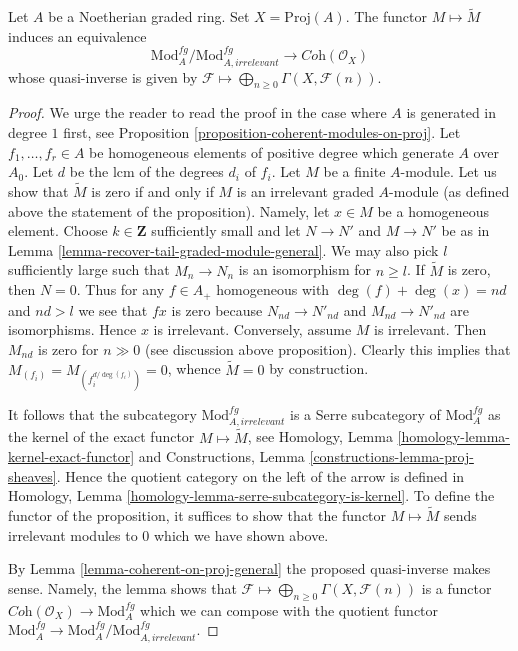 \begin{proposition}
\label{proposition-coherent-modules-on-proj-general}
Let $A$ be a Noetherian graded ring. Set $X = \text{Proj}(A)$. The functor
$M \mapsto \widetilde M$ induces an equivalence
$$
\text{Mod}^{fg}_A/\text{Mod}^{fg}_{A, irrelevant}
\longrightarrow
\textit{Coh}(\mathcal{O}_X)
$$
whose quasi-inverse is given by
$\mathcal{F} \longmapsto \bigoplus_{n \geq 0} \Gamma(X, \mathcal{F}(n))$.
\end{proposition}

\begin{proof}
We urge the reader to read the proof in the case where $A$
is generated in degree $1$ first, see
Proposition \ref{proposition-coherent-modules-on-proj}.
Let $f_1, \ldots, f_r \in A$ be homogeneous elements of positive degree
which generate $A$ over $A_0$. Let $d$ be the lcm of the degrees
$d_i$ of $f_i$. Let $M$ be a finite $A$-module.
Let us show that $\widetilde{M}$ is zero if and
only if $M$ is an irrelevant graded $A$-module (as defined above
the statement of the proposition). Namely, let $x \in M$ be a
homogeneous element.
Choose $k \in \mathbf{Z}$ sufficiently small and let
$N \to N'$ and $M \to N'$ be as in
Lemma \ref{lemma-recover-tail-graded-module-general}.
We may also pick $l$ sufficiently large such that
$M_n \to N_n$ is an isomorphism for $n \geq l$.
If $\widetilde{M}$ is zero, then $N = 0$.
Thus for any $f \in A_+$ homogeneous with
$\deg(f) + \deg(x) = nd$ and $nd > l$ we see that $fx$ is zero
because $N_{nd} \to N'_{nd}$ and $M_{nd} \to N'_{nd}$ are isomorphisms.
Hence $x$ is irrelevant.
Conversely, assume $M$ is irrelevant. Then $M_{nd}$ is zero
for $n \gg 0$ (see discussion above proposition).
Clearly this implies that $M_{(f_i)} = M_{(f_i^{d/\deg(f_i)})} = 0$,
whence $\widetilde{M} = 0$ by construction.

\medskip\noindent
It follows that the subcategory $\text{Mod}^{fg}_{A, irrelevant}$
is a Serre subcategory of $\text{Mod}^{fg}_A$ as the kernel
of the exact functor $M \mapsto \widetilde M$, see
Homology, Lemma \ref{homology-lemma-kernel-exact-functor}
and Constructions, Lemma \ref{constructions-lemma-proj-sheaves}.
Hence the quotient category on the left of the arrow is defined
in Homology, Lemma \ref{homology-lemma-serre-subcategory-is-kernel}.
To define the functor of the proposition, it suffices to show that
the functor $M \mapsto \widetilde M$ sends irrelevant modules to $0$
which we have shown above.

\medskip\noindent
By Lemma \ref{lemma-coherent-on-proj-general} the proposed quasi-inverse
makes sense. Namely, the lemma shows that
$\mathcal{F} \longmapsto \bigoplus_{n \geq 0} \Gamma(X, \mathcal{F}(n))$
is a functor $\textit{Coh}(\mathcal{O}_X) \to \text{Mod}^{fg}_A$
which we can compose with the quotient functor
$\text{Mod}^{fg}_A \to \text{Mod}^{fg}_A/\text{Mod}^{fg}_{A, irrelevant}$.


\end{proof}
